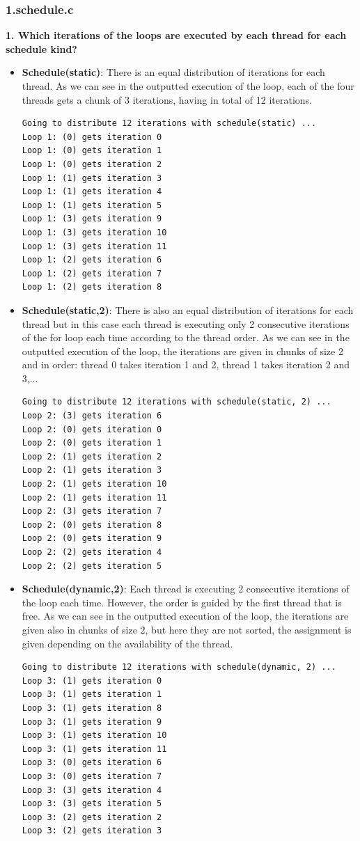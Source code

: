 \documentclass[12]{article}
\begin{document}
\subsubsection{1.schedule.c}
\textbf{1. Which iterations of the loops are executed by each thread for each schedule kind?}
\begin{itemize}
\item \textbf{Schedule(static)}: There is an equal distribution of iterations for each thread. As we can see in the outputted execution of the loop, each of the four threads gets a chunk of 3 iterations, having in total of 12 iterations. 
\\
\begin{lstlisting}[frame=single]
Going to distribute 12 iterations with schedule(static) ...
Loop 1: (0) gets iteration 0
Loop 1: (0) gets iteration 1
Loop 1: (0) gets iteration 2
Loop 1: (1) gets iteration 3
Loop 1: (1) gets iteration 4
Loop 1: (1) gets iteration 5
Loop 1: (3) gets iteration 9
Loop 1: (3) gets iteration 10
Loop 1: (3) gets iteration 11
Loop 1: (2) gets iteration 6
Loop 1: (2) gets iteration 7
Loop 1: (2) gets iteration 8
\end{lstlisting}

\item \textbf{Schedule(static,2)}: There is also an equal distribution of iterations for each thread but in this case each thread is executing only 2 consecutive iterations of the for loop each time according to the thread order.
As we can see in the outputted execution of the loop, the iterations are given in chunks of size 2 and in order: thread 0 takes iteration 1 and 2, thread 1 takes iteration 2 and 3,...
\\
\begin{lstlisting}[frame=single]
Going to distribute 12 iterations with schedule(static, 2) ...
Loop 2: (3) gets iteration 6
Loop 2: (0) gets iteration 0
Loop 2: (0) gets iteration 1
Loop 2: (1) gets iteration 2
Loop 2: (1) gets iteration 3
Loop 2: (1) gets iteration 10
Loop 2: (1) gets iteration 11
Loop 2: (3) gets iteration 7
Loop 2: (0) gets iteration 8
Loop 2: (0) gets iteration 9
Loop 2: (2) gets iteration 4
Loop 2: (2) gets iteration 5
\end{lstlisting}


\item \textbf{Schedule(dynamic,2)}: Each thread is executing 2 consecutive iterations of the loop each time. However, the order is guided by the first thread that is free. 
As we can see in the outputted execution of the loop, the iterations are given also in chunks of size 2, but here they are not sorted, the assignment is given depending on the availability of the thread. 
\\
\begin{lstlisting}[frame=single]
Going to distribute 12 iterations with schedule(dynamic, 2) ...
Loop 3: (1) gets iteration 0
Loop 3: (1) gets iteration 1
Loop 3: (1) gets iteration 8
Loop 3: (1) gets iteration 9
Loop 3: (1) gets iteration 10
Loop 3: (1) gets iteration 11
Loop 3: (0) gets iteration 6
Loop 3: (0) gets iteration 7
Loop 3: (3) gets iteration 4
Loop 3: (3) gets iteration 5
Loop 3: (2) gets iteration 2
Loop 3: (2) gets iteration 3
\end{lstlisting}


\end{itemize}
\end{document}
